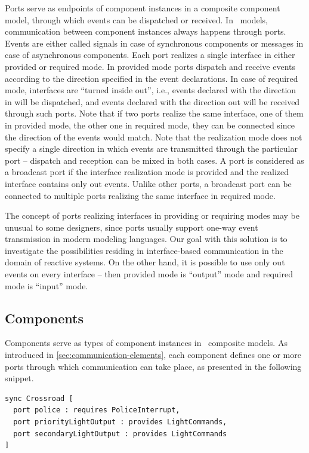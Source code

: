 Ports serve as endpoints of component instances in a composite component model,
through which events can be dispatched or received. In \gamma\ models, communication between component
instances always happens through ports. Events are either called signals in case of
synchronous components or messages in case of asynchronous components. Each port realizes
a single interface in either provided or required mode. In provided mode ports dispatch and receive events according to the direction specified in the event declarations. In case of required mode, interfaces are ``turned inside out'', i.e., events declared with the direction in will be
dispatched, and events declared with the direction out will be received through such ports. Note that if two ports realize the same interface, one of them in provided mode, the other
one in required mode, they can be connected since the direction of the events would match. Note that
the realization mode does not specify a single direction in which events are transmitted
through the particular port – dispatch and reception can be mixed in both cases. A port is considered as a broadcast port if the interface realization mode is provided and
the realized interface contains only out events. Unlike other ports, a broadcast port can
be connected to multiple ports realizing the same interface in required mode.

The concept of ports realizing interfaces in providing or requiring modes may be unusual to
some designers, since ports usually support one-way event transmission in modern modeling
languages. Our goal with this solution is to investigate the possibilities residing in interface-based
communication in the domain of reactive systems. On the other hand, it is possible to
use only out events on every interface -- then provided mode is ``output'' mode and required
mode is ``input'' mode.

\subsection{Components}
Components serve as types of component instances in \gamma\ composite models. As introduced in \ref{sec:communication-elements}, each component defines one or more ports through which communication can take place, as presented in the following snippet.
\begin{lstlisting}
sync Crossroad [
  port police : requires PoliceInterrupt,
  port priorityLightOutput : provides LightCommands,
  port secondaryLightOutput : provides LightCommands
]
\end{lstlisting}

